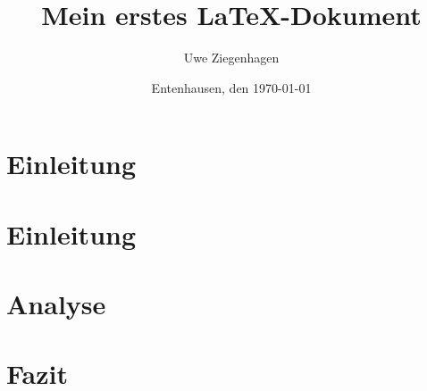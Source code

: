 \documentclass[12pt,ngerman]{scrartcl}
\author{Uwe Ziegenhagen}
\title{Mein erstes LaTeX-Dokument}
\date{Entenhausen, den \today}
\begin{document}
\maketitle

\section{Einleitung}

\blindtext

\section{Einleitung}

\section{Analyse}


\section{Fazit}
\end{document}
